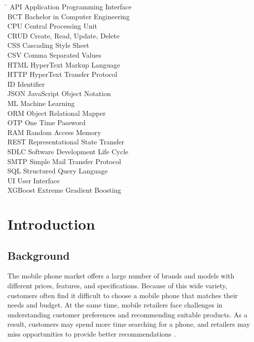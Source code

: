 \documentclass[12pt, a4paper]{report}
\numberwithin{equation}{chapter}
\begin{document}
\begin{tabbing}
\hspace{3cm} \= \kill
API \> Application Programming Interface \\
BCT \> Bachelor in Computer Engineering \\
CPU \> Central Processing Unit \\
CRUD \> Create, Read, Update, Delete \\
CSS \> Cascading Style Sheet \\
CSV \> Comma Separated Values \\
HTML \> HyperText Markup Language \\
HTTP \> HyperText Transfer Protocol \\
ID \> Identifier \\
JSON \> JavaScript Object Notation \\
ML \> Machine Learning \\
ORM \> Object Relational Mapper \\
OTP \> One Time Password \\
RAM \> Random Access Memory \\
REST \> Representational State Transfer \\
SDLC \> Software Development Life Cycle \\
SMTP \> Simple Mail Transfer Protocol \\
SQL \> Structured Query Language \\
UI \> User Interface \\
XGBoost \> Extreme Gradient Boosting \\
\end{tabbing}

\newpage

\setcounter{page}{1}

\chapter{Introduction}

\section{Background}

The mobile phone market offers a large number of brands and models with different prices, features, and specifications. Because of this wide variety, customers often find it difficult to choose a mobile phone that matches their needs and budget. At the same time, mobile retailers face challenges in understanding customer preferences and recommending suitable products. As a result, customers may spend more time searching for a phone, and retailers may miss opportunities to provide better recommendations \cite{singh}.
\end{document}
